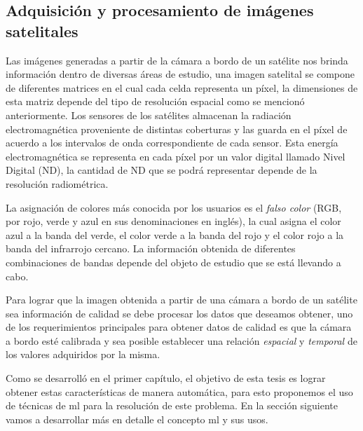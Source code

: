 \subsection{Adquisición y procesamiento de imágenes satelitales}\label{sub:imagen_satelital}

Las imágenes generadas a partir de la cámara a bordo de un satélite nos brinda información dentro de diversas áreas de estudio, una imagen satelital se compone de diferentes matrices en el cual cada celda representa un píxel, la dimensiones de esta matriz depende del tipo de resolución espacial como se mencionó anteriormente. Los sensores de los satélites almacenan la radiación electromagnética proveniente de distintas coberturas y las guarda en el píxel de acuerdo a los intervalos de onda correspondiente de cada sensor. Esta energía electromagnética se representa en cada píxel por un valor digital llamado Nivel Digital (ND), la cantidad de ND que se podrá representar depende de la resolución radiométrica.

La asignación de colores más conocida por los usuarios es el \textit{falso color} (RGB, por rojo, verde y azul en sus denominaciones en inglés), la cual asigna el color azul a la banda del verde, el color verde a la banda del rojo y el color rojo a la banda del infrarrojo cercano. La información obtenida de diferentes combinaciones de bandas depende del objeto de estudio que se está llevando a cabo.


Para lograr que la imagen obtenida a partir de una cámara a bordo de un satélite sea información de calidad se debe procesar los datos que deseamos obtener, uno de los requerimientos principales para obtener datos de calidad es que la cámara a bordo esté calibrada y sea posible establecer una relación \textit{espacial} y \textit{temporal} de los valores adquiridos por la misma.

Como se desarrolló en el primer capítulo, el objetivo de esta tesis es lograr obtener estas características de manera automática, para esto proponemos el uso de técnicas de \ac{ml} para la resolución de este problema. En la sección siguiente vamos a desarrollar más en detalle  el concepto \ac{ml} y sus usos.




